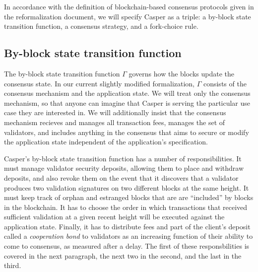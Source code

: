 \documentclass[11pt,a4paper]{article}
\begin{document}
In accordance with the definition of blockchain-based consensus protocols given in the reformalization document\cite{ReformalizingConsensus}, we will specify Casper as a triple: a by-block state transition function, a consensus strategy, and a fork-choice rule. 

\subsection{By-block state transition function}

The by-block state transition function $\Gamma$ governs how the blocks update the consensus state. In our current slightly modified formalization, $\Gamma$ consists of the consensus mechanism and the application state. We will treat only the consensus mechanism, so that anyone can imagine that Casper is serving the particular use case they are interested in. We will additionally insist that the consensus mechanism recieves and manages all transaction fees, manages the set of validators, and includes anything in the consensus that aims to secure or modify the application state independent of the application's specification. 

Casper's by-block state transition function has a number of responsibilities. It must manage validator security deposits, allowing them to place and withdraw deposits, and also revoke them on the event that it discovers that a validator produces two validation signatures on two different blocks at the same height. It must keep track of orphan and estranged blocks that are are ``included'' by blocks in the blockchain. It has to choose the order in which transactions that received sufficient validation at a given recent height will be executed against the application state. Finally, it has to distribute fees and part of the client's deposit called a \emph{cooperation bond} to validators as an increasing function of their ability to come to consensus, as measured after a delay. The first of these responsbilities is covered in the next paragraph, the next two in the second, and the last in the third.
\end{document}
